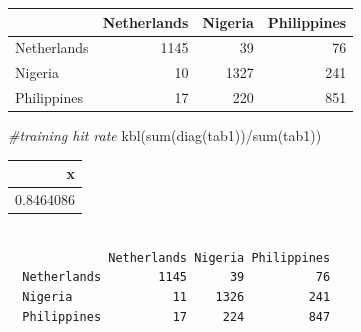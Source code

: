 \documentclass[
  11pt,
]{article}
\newenvironment{Shaded}{\begin{snugshade}}{\end{snugshade}}
\newcommand{\AttributeTok}[1]{\textcolor[rgb]{0.77,0.63,0.00}{#1}}
\newcommand{\CommentTok}[1]{\textcolor[rgb]{0.56,0.35,0.01}{\textit{#1}}}
\newcommand{\ConstantTok}[1]{\textcolor[rgb]{0.00,0.00,0.00}{#1}}
\newcommand{\DecValTok}[1]{\textcolor[rgb]{0.00,0.00,0.81}{#1}}
\newcommand{\FunctionTok}[1]{\textcolor[rgb]{0.00,0.00,0.00}{#1}}
\newcommand{\NormalTok}[1]{#1}
\newcommand{\OtherTok}[1]{\textcolor[rgb]{0.56,0.35,0.01}{#1}}
\newcommand{\SpecialCharTok}[1]{\textcolor[rgb]{0.00,0.00,0.00}{#1}}
\begin{document}
\begin{tabular}[t]{l|r|r|r}
\hline
  & Netherlands & Nigeria & Philippines\\
\hline
Netherlands & 1145 & 39 & 76\\
\hline
Nigeria & 10 & 1327 & 241\\
\hline
Philippines & 17 & 220 & 851\\
\hline
\end{tabular}

\begin{Shaded}
\begin{Highlighting}[]
\CommentTok{\#training hit rate}
\FunctionTok{kbl}\NormalTok{(}\FunctionTok{sum}\NormalTok{(}\FunctionTok{diag}\NormalTok{(tab1))}\SpecialCharTok{/}\FunctionTok{sum}\NormalTok{(tab1))}
\end{Highlighting}
\end{Shaded}

\begin{tabular}[t]{r}
\hline
x\\
\hline
0.8464086\\
\hline
\end{tabular}

\begin{Shaded}
\end{Shaded}

\begin{verbatim}
             
              Netherlands Nigeria Philippines
  Netherlands        1145      39          76
  Nigeria              11    1326         241
  Philippines          17     224         847
\end{verbatim}
\end{document}
